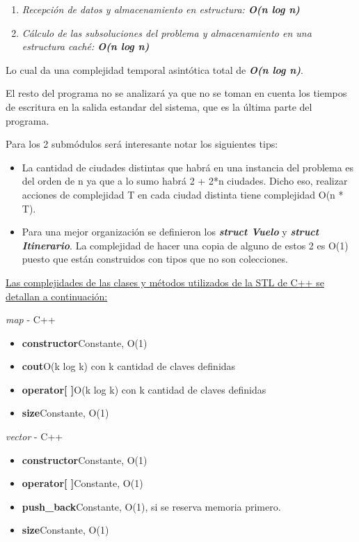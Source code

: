 \begin{enumerate}
\item \textit{Recepción de datos y almacenamiento en estructura: \textbf{O(n log n)}}
\item \textit{Cálculo de las subsoluciones del problema y almacenamiento en una estructura caché: \textbf{O(n log n)}}
\end{enumerate}

\noindent Lo cual da una complejidad temporal asintótica total de \textit{\textbf{O(n log n)}}.

\noindent El resto del programa no se analizará ya que no se toman en cuenta los tiempos de escritura en la salida estandar del sistema, que es la última parte del programa.

\noindent Para los 2 submódulos será interesante notar los siguientes tips:
\begin{itemize}
\item La cantidad de ciudades distintas que habrá en una instancia del problema es del orden de n ya que a lo sumo habrá 2 + 2*n ciudades. Dicho eso, realizar acciones de complejidad T en cada ciudad distinta tiene complejidad O(n * T).
\item Para una mejor organización se definieron los \textit{\textbf{struct Vuelo}} y \textit{\textbf{struct Itinerario}}. La complejidad de hacer una copia de alguno de estos 2 es O(1) puesto que están construidos con tipos que no son colecciones.\\
\end{itemize}

\underline{Las complejidades de las clases y métodos utilizados de la STL de C++ se detallan a continuación:}

\indent \textit{map} - C++
\begin{itemize}
\item \textbf{constructor}\hspace{10 px}Constante, O(1)
\item \textbf{cout}\hspace{46 px}O(k log k) con k cantidad de claves definidas
\item \textbf{operator[ ]}\hspace{15 px}O(k log k) con k cantidad de claves definidas
\item \textbf{size}\hspace{50 px}Constante, O(1)
\end{itemize}

\indent \textit{vector} - C++
\begin{itemize}
\item \textbf{constructor}\hspace{11 px}Constante, O(1)
\item \textbf{operator[ ]}\hspace{15 px}Constante, O(1)
\item \textbf{push\_back}\hspace{17 px}Constante, O(1), si se reserva memoria primero.
\item \textbf{size}\hspace{50 px}Constante, O(1)
\end{itemize}

